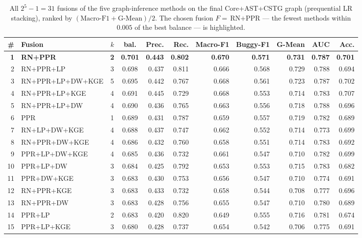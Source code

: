 \begin{table}[H]
\centering \scriptsize
\caption{All $2^5-1=31$ fusions of the five graph-inference methods on the final Core+AST+CSTG graph (prequential LR stacking), ranked by $(\text{Macro-F1}+\text{G-Mean})/2$. The chosen fusion $F=$\,RN$+$PPR --- the fewest methods within $0.005$ of the best balance --- is highlighted.}
\label{tab:v4-final-fusion-ablation}
\begin{tabular}{rlccrrrrrrr}
\toprule
\# & Fusion & $k$ & bal. & Prec. & Rec. & Macro-F1 & Buggy-F1 & G-Mean & AUC & Acc. \\
\midrule
\textbf{1} & \textbf{RN+PPR} & \textbf{2} & \textbf{0.701} & \textbf{0.443} & \textbf{0.802} & \textbf{0.670} & \textbf{0.571} & \textbf{0.731} & \textbf{0.787} & \textbf{0.701} \\
2 & RN+PPR+LP & 3 & 0.698 & 0.437 & 0.811 & 0.666 & 0.568 & 0.729 & 0.788 & 0.694 \\
3 & RN+PPR+LP+DW+KGE & 5 & 0.695 & 0.442 & 0.767 & 0.668 & 0.561 & 0.723 & 0.787 & 0.702 \\
4 & RN+PPR+LP+KGE & 4 & 0.691 & 0.445 & 0.729 & 0.668 & 0.553 & 0.714 & 0.783 & 0.707 \\
5 & RN+PPR+LP+DW & 4 & 0.690 & 0.436 & 0.765 & 0.663 & 0.556 & 0.718 & 0.788 & 0.696 \\
6 & PPR & 1 & 0.689 & 0.431 & 0.787 & 0.659 & 0.557 & 0.719 & 0.782 & 0.689 \\
7 & RN+LP+DW+KGE & 4 & 0.688 & 0.437 & 0.747 & 0.662 & 0.552 & 0.714 & 0.773 & 0.699 \\
8 & RN+PPR+DW+KGE & 4 & 0.686 & 0.432 & 0.760 & 0.658 & 0.551 & 0.714 & 0.783 & 0.692 \\
9 & PPR+LP+DW+KGE & 4 & 0.685 & 0.436 & 0.732 & 0.661 & 0.547 & 0.710 & 0.782 & 0.699 \\
10 & PPR+LP+DW & 3 & 0.684 & 0.425 & 0.792 & 0.653 & 0.553 & 0.715 & 0.783 & 0.682 \\
11 & PPR+DW+KGE & 3 & 0.683 & 0.430 & 0.753 & 0.656 & 0.547 & 0.710 & 0.774 & 0.691 \\
12 & RN+PPR+KGE & 3 & 0.683 & 0.433 & 0.732 & 0.658 & 0.544 & 0.708 & 0.777 & 0.696 \\
13 & RN+PPR+DW & 3 & 0.683 & 0.428 & 0.756 & 0.655 & 0.547 & 0.710 & 0.780 & 0.689 \\
14 & PPR+LP & 2 & 0.683 & 0.420 & 0.820 & 0.649 & 0.555 & 0.716 & 0.781 & 0.674 \\
15 & PPR+LP+KGE & 3 & 0.680 & 0.428 & 0.737 & 0.654 & 0.542 & 0.706 & 0.775 & 0.691 \\

\end{tabular}
\end{table}
